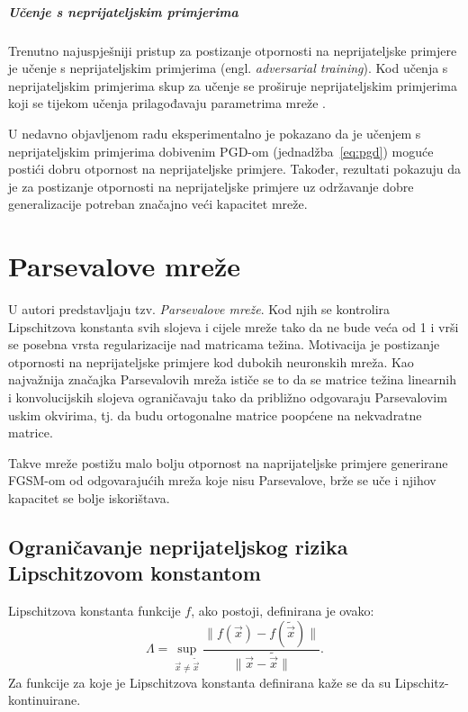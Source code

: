 \documentclass[utf8, seminar, numeric, lmodern]{feri}
\begin{document}
\paragraph{Učenje s neprijateljskim primjerima} Trenutno najuspješniji pristup za postizanje otpornosti na neprijateljske primjere je učenje s neprijateljskim primjerima (engl. \emph{adversarial training}). Kod učenja s neprijateljskim primjerima skup za učenje se proširuje neprijateljskim primjerima koji se tijekom učenja prilagođavaju parametrima mreže \cite{goodfellow14-ehae, kurakin-amls}.

U nedavno objavljenom radu \cite{madry17-tdlmraa} eksperimentalno je pokazano da je učenjem s neprijateljskim primjerima dobivenim PGD-om (jednadžba~\ref{eq:pgd}) moguće postići dobru otpornost na neprijateljske primjere. Također, rezultati pokazuju da je za postizanje otpornosti na neprijateljske primjere uz održavanje dobre generalizacije potreban značajno veći kapacitet mreže.

\chapter{Parsevalove mreže}

U \cite{cisse17-pn} autori predstavljaju tzv. \emph{Parsevalove mreže}. Kod njih se kontrolira Lipschitzova konstanta svih slojeva i cijele mreže tako da ne bude veća od 1 i vrši se posebna vrsta regularizacije nad matricama težina. Motivacija je postizanje otpornosti na neprijateljske primjere kod dubokih neuronskih mreža. Kao najvažnija značajka Parsevalovih mreža ističe se to da se matrice težina linearnih i konvolucijskih slojeva ograničavaju tako da približno odgovaraju Parsevalovim uskim okvirima, tj. da budu ortogonalne matrice poopćene na nekvadratne matrice.

Takve mreže postižu malo bolju otpornost na naprijateljske primjere generirane FGSM-om od odgovarajućih mreža koje nisu Parsevalove, brže se uče i njihov kapacitet se bolje iskorištava.

\section{Ograničavanje neprijateljskog rizika Lipschitzovom konstantom}

Lipschitzova konstanta funkcije $f$, ako postoji, definirana je ovako:
\begin{equation}
\Lambda = \sup_{\vec x\neq \widetilde{\vec x}} \frac{\lVert f(\vec x)-f(\widetilde{\vec x})\rVert}{\lVert \vec x-\widetilde{\vec x}\rVert}.
\end{equation}
Za funkcije za koje je Lipschitzova konstanta definirana kaže se da su Lipschitz-kontinuirane.
\end{document}
